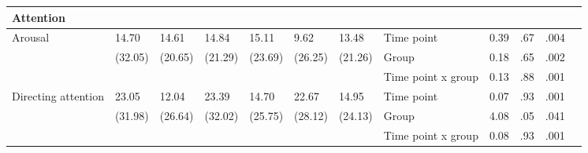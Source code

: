 \documentclass[authordate, empirical,issue]{jote-new-article}
\begin{document}
\begin{table}[t]
\begin{fullwidth}
{\begin{tabular}{@{} l l l l l l l | l l l l l @{}}
        \textbf{Attention}                             &                                               &                      &                      &               &                                       &         &                    &       &      &      & \\

        \hline Arousal                                 & 14.70                                         & 14.61                & 14.84                & 15.11
                                                       & 9.62                                          & 13.48                & Time point           &
        0.39                                           & .67                                           & .004                                                                                                                                                       \\
                                                       & (32.05)                                       & (20.65)              & (21.29)              & (23.69)       & (26.25)                               & (21.26) & Group              & 0.18  & .65  & .002 & \\
                                                       &                                               &                      &                      &               &                                       &         & Time point x group & 0.13  & .88  & .001
        \\

        \hline Directing attention                     & 23.05                                         & 12.04                & 23.39                & 14.70         & 22.67                                 & 14.95   & Time point         & 0.07  & .93  & .001   \\
                                                       & (31.98)                                       & (26.64)              & (32.02)              & (25.75)       & (28.12)                               & (24.13) & Group              & 4.08  & .05  & .041   \\
                                                       &                                               &                      &                      &               &                                       &         & Time point x group & 0.08  & .93  & .001   \\


\end{tabular}}
\end{fullwidth}
\end{table}
\end{document}
